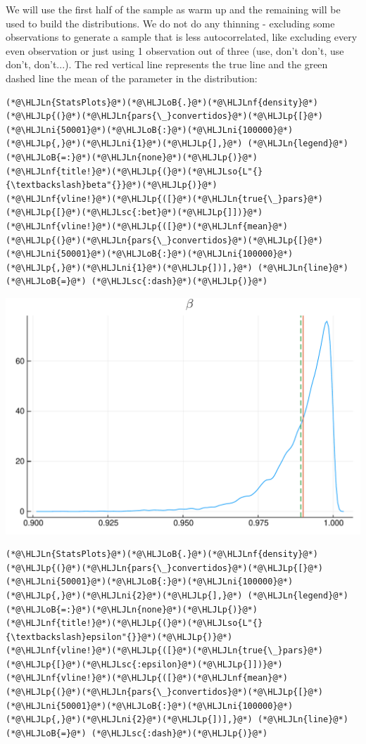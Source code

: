 \documentclass[12pt,a4paper]{article}
\newcommand{\HLJLn}[1]{#1}
\newcommand{\HLJLnf}[1]{\textcolor[RGB]{66,102,213}{#1}}
\newcommand{\HLJLsc}[1]{\textcolor[RGB]{201,61,57}{#1}}
\newcommand{\HLJLso}[1]{\textcolor[RGB]{201,61,57}{#1}}
\newcommand{\HLJLni}[1]{\textcolor[RGB]{59,151,46}{#1}}
\newcommand{\HLJLoB}[1]{\textcolor[RGB]{102,102,102}{\textbf{#1}}}
\newcommand{\HLJLp}[1]{#1}
\begin{document}
We will use the first half of the sample as warm up and the remaining will be used to build the distributions. We do not do any thinning - excluding some observations to generate a sample that is less autocorrelated, like excluding every even observation or just using 1 observation out of three (use, don't don't, use don't, don't...). The red vertical line represents the true line and the green dashed line the mean of the parameter in the distribution:


\begin{lstlisting}
(*@\HLJLn{StatsPlots}@*)(*@\HLJLoB{.}@*)(*@\HLJLnf{density}@*)(*@\HLJLp{(}@*)(*@\HLJLn{pars{\_}convertidos}@*)(*@\HLJLp{[}@*)(*@\HLJLni{50001}@*)(*@\HLJLoB{:}@*)(*@\HLJLni{100000}@*)(*@\HLJLp{,}@*)(*@\HLJLni{1}@*)(*@\HLJLp{],}@*) (*@\HLJLn{legend}@*) (*@\HLJLoB{=:}@*)(*@\HLJLn{none}@*)(*@\HLJLp{)}@*)
(*@\HLJLnf{title!}@*)(*@\HLJLp{(}@*)(*@\HLJLso{L"{}{\textbackslash}beta"{}}@*)(*@\HLJLp{)}@*)
(*@\HLJLnf{vline!}@*)(*@\HLJLp{([}@*)(*@\HLJLn{true{\_}pars}@*)(*@\HLJLp{[}@*)(*@\HLJLsc{:bet}@*)(*@\HLJLp{]])}@*)
(*@\HLJLnf{vline!}@*)(*@\HLJLp{([}@*)(*@\HLJLnf{mean}@*)(*@\HLJLp{(}@*)(*@\HLJLn{pars{\_}convertidos}@*)(*@\HLJLp{[}@*)(*@\HLJLni{50001}@*)(*@\HLJLoB{:}@*)(*@\HLJLni{100000}@*)(*@\HLJLp{,}@*)(*@\HLJLni{1}@*)(*@\HLJLp{])],}@*) (*@\HLJLn{line}@*) (*@\HLJLoB{=}@*) (*@\HLJLsc{:dash}@*)(*@\HLJLp{)}@*)
\end{lstlisting}

\includegraphics[width=\linewidth]{figures/dsge_and_julia_25_1.pdf}

\begin{lstlisting}
(*@\HLJLn{StatsPlots}@*)(*@\HLJLoB{.}@*)(*@\HLJLnf{density}@*)(*@\HLJLp{(}@*)(*@\HLJLn{pars{\_}convertidos}@*)(*@\HLJLp{[}@*)(*@\HLJLni{50001}@*)(*@\HLJLoB{:}@*)(*@\HLJLni{100000}@*)(*@\HLJLp{,}@*)(*@\HLJLni{2}@*)(*@\HLJLp{],}@*) (*@\HLJLn{legend}@*) (*@\HLJLoB{=:}@*)(*@\HLJLn{none}@*)(*@\HLJLp{)}@*)
(*@\HLJLnf{title!}@*)(*@\HLJLp{(}@*)(*@\HLJLso{L"{}{\textbackslash}epsilon"{}}@*)(*@\HLJLp{)}@*)
(*@\HLJLnf{vline!}@*)(*@\HLJLp{([}@*)(*@\HLJLn{true{\_}pars}@*)(*@\HLJLp{[}@*)(*@\HLJLsc{:epsilon}@*)(*@\HLJLp{]])}@*)
(*@\HLJLnf{vline!}@*)(*@\HLJLp{([}@*)(*@\HLJLnf{mean}@*)(*@\HLJLp{(}@*)(*@\HLJLn{pars{\_}convertidos}@*)(*@\HLJLp{[}@*)(*@\HLJLni{50001}@*)(*@\HLJLoB{:}@*)(*@\HLJLni{100000}@*)(*@\HLJLp{,}@*)(*@\HLJLni{2}@*)(*@\HLJLp{])],}@*) (*@\HLJLn{line}@*) (*@\HLJLoB{=}@*) (*@\HLJLsc{:dash}@*)(*@\HLJLp{)}@*)
\end{lstlisting}
\end{document}
